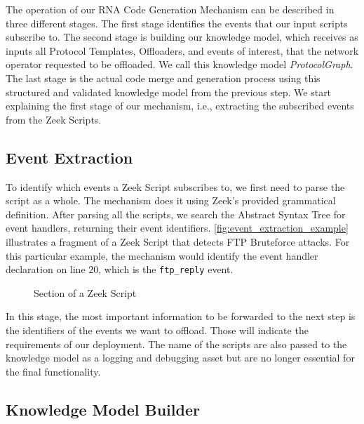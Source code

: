 The operation of our RNA Code Generation Mechanism can be described in three different stages. The first stage identifies the events that our input scripts subscribe to. The second stage is building our knowledge model, which receives as inputs all Protocol Templates, Offloaders, and events of interest, that the network operator requested to be offloaded. We call this knowledge model \textit{ProtocolGraph}. The last stage is the actual code merge and generation process using this structured and validated knowledge model from the previous step. We start explaining the first stage of our mechanism, i.e., extracting the subscribed events from the Zeek Scripts.

\subsection{Event Extraction}

To identify which events a Zeek Script subscribes to, we first need to parse the script as a whole. The mechanism does it using Zeek's provided grammatical definition. After parsing all the scripts, we search the Abstract Syntax Tree for event handlers, returning their event identifiers. \autoref{fig:event_extraction_example} illustrates a fragment of a Zeek Script that detects FTP Bruteforce attacks. For this particular example, the mechanism would identify the event handler declaration on line $20$, which is the \texttt{ftp\_reply} event.

\begin{figure}[htb]
    \caption{Section of a Zeek Script}
    \begin{center}
        
    \end{center}
    \label{fig:event_extraction_example}
\end{figure}

In this stage, the most important information to be forwarded to the next step is the identifiers of the events we want to offload. Those will indicate the requirements of our deployment. The name of the scripts are also passed to the knowledge model as a logging and debugging asset but are no longer essential for the final functionality.

\subsection{Knowledge Model Builder}

